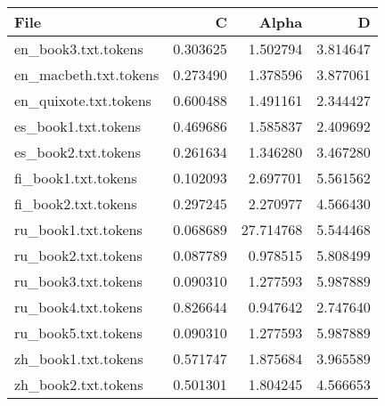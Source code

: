 \begin{tabular}{lrrr}
\toprule
File & C & Alpha & D \\
\midrule
en_book3.txt.tokens & 0.303625 & 1.502794 & 3.814647 \\
en_macbeth.txt.tokens & 0.273490 & 1.378596 & 3.877061 \\
en_quixote.txt.tokens & 0.600488 & 1.491161 & 2.344427 \\
es_book1.txt.tokens & 0.469686 & 1.585837 & 2.409692 \\
es_book2.txt.tokens & 0.261634 & 1.346280 & 3.467280 \\
fi_book1.txt.tokens & 0.102093 & 2.697701 & 5.561562 \\
fi_book2.txt.tokens & 0.297245 & 2.270977 & 4.566430 \\
ru_book1.txt.tokens & 0.068689 & 27.714768 & 5.544468 \\
ru_book2.txt.tokens & 0.087789 & 0.978515 & 5.808499 \\
ru_book3.txt.tokens & 0.090310 & 1.277593 & 5.987889 \\
ru_book4.txt.tokens & 0.826644 & 0.947642 & 2.747640 \\
ru_book5.txt.tokens & 0.090310 & 1.277593 & 5.987889 \\
zh_book1.txt.tokens & 0.571747 & 1.875684 & 3.965589 \\
zh_book2.txt.tokens & 0.501301 & 1.804245 & 4.566653 \\
\bottomrule
\end{tabular}

